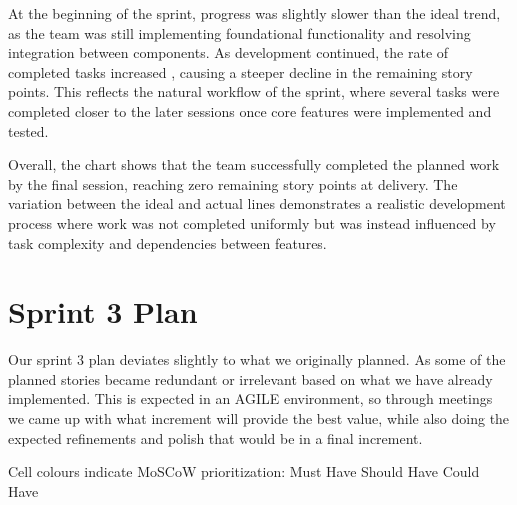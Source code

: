 \documentclass[a4paper,12pt]{article}
\begin{document}
At the beginning of the sprint, progress was slightly slower than the ideal trend, as the team was still implementing foundational functionality and resolving integration between components. As development continued, the rate of completed tasks increased , causing a steeper decline in the remaining story points. This reflects the natural workflow of the sprint, where several tasks were completed closer to the later sessions once core features were implemented and tested.

Overall, the chart shows that the team successfully completed the planned work by the final session, reaching zero remaining story points at delivery. The variation between the ideal and actual lines demonstrates a realistic development process where work was not completed uniformly but was instead influenced by task complexity and dependencies between features.
\newpage
\section{Sprint 3 Plan}

Our sprint 3 plan deviates slightly to what we originally planned. As some of the planned stories became redundant or irrelevant based on what we have already implemented. This is expected in an AGILE environment, so through meetings we came up with what increment will provide the best value, while also doing the expected refinements and polish that would be in a final increment.

\noindent Cell colours indicate MoSCoW prioritization:
\colorbox{green!8}{Must Have} \quad
\colorbox{blue!5}{Should Have} \quad 
\colorbox{yellow!5}{Could Have}
\end{document}
